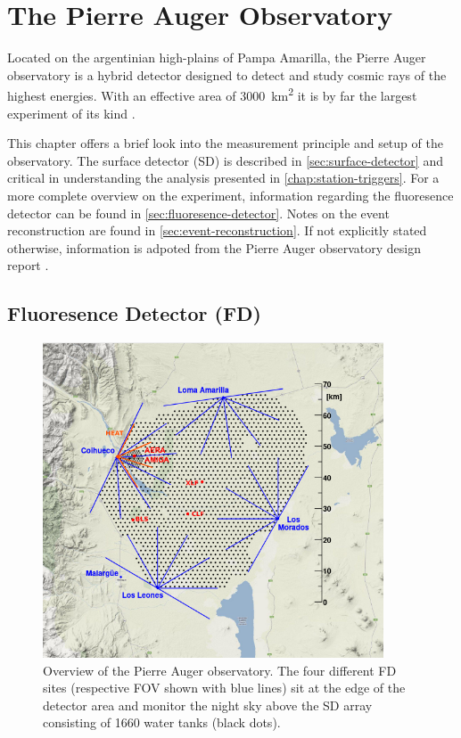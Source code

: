 
\chapter{The Pierre Auger Observatory}
\label{chap:auger-observatory}

Located on the argentinian high-plains of Pampa Amarilla, the Pierre Auger observatory is a hybrid detector designed to detect and study cosmic 
rays of the highest energies. With an effective area of \SI{3000}{\kilo\meter\squared} it is by far the largest experiment of its kind 
\cite{DesignReport}.

This chapter offers a brief look into the measurement principle and setup of the observatory. The  surface detector (SD) is described in 
\autoref{sec:surface-detector} and critical in understanding the analysis presented in \autoref{chap:station-triggers}. For a more complete 
overview on the experiment, information regarding the fluoresence detector can be found in \autoref{sec:fluoresence-detector}. Notes on the event
reconstruction are found in \autoref{sec:event-reconstruction}. If not explicitly stated otherwise, information is adpoted from the Pierre Auger 
observatory design report \cite{DesignReport}.

\section{Fluoresence Detector (FD)}
\label{sec:fluoresence-detector}

\begin{figure}
	\centering
	\includegraphics[width=0.9\textwidth]{plots/auger_array.png}
	\caption{Overview of the Pierre Auger observatory. The four different FD sites (respective FOV shown with blue lines) sit at the edge of
	the detector area and monitor the night sky above the SD array consisting of 1660 water tanks (black dots).}
	\label{fig:auger-array}
\end{figure}

